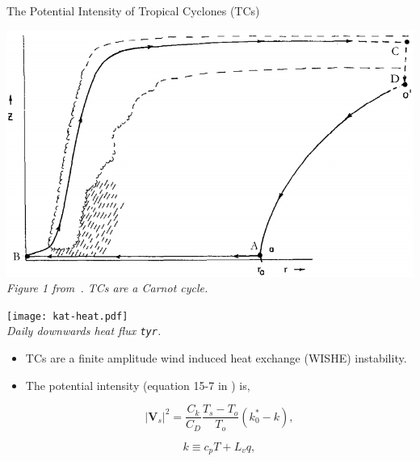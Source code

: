 \begin{frame}{The Potential Intensity of Tropical Cyclones (TCs)}
\vspace{-30pt}
\hspace{-30pt}\begin{minipage}{1.1\linewidth}
\centering
\begin{minipage}{0.45\linewidth}
\centering
    \includegraphics[width=\linewidth]{images/hurricane-carnot.png}\\
    \textit{Figure 1 from~\cite{emanuel1991theory}.
    TCs are a Carnot cycle. }
    \end{minipage}
\begin{minipage}{0.45\linewidth}
\texttt{[image: kat-heat.pdf]}\\
\textit{Daily downwards heat flux
        \texttt{tyr}.}
       \end{minipage}
\end{minipage}
\begin{itemize}
\item TCs are a finite amplitude wind induced heat exchange (WISHE) instability.
\item The potential intensity (equation 15-7 in \cite{emanuel2018progress}) is,

\begin{minipage}{0.45\linewidth}
\begin{equation}
\left|\mathbf{V}_{s}\right|^{2}=\frac{C_{k}}{C_{D}}
\frac{T_{s}-T_{o}}{T_{o}}\left(k_{0}^{*}-k\right),
\tag{PI}
\label{eq:PI}
\end{equation}
\end{minipage}
\begin{minipage}{0.45\linewidth}
\begin{equation}
k \equiv c_{p} T+L_{v} q,
\label{eq:enthalpy_per_unit_mass}
\end{equation}
\end{minipage}
\end{itemize}
\end{frame}

